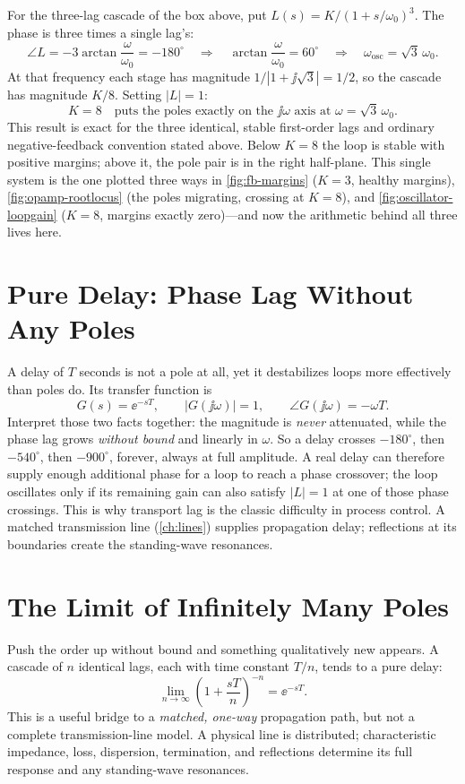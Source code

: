 For the three-lag cascade of the box above, put \(L(s)=K/(1+s/\omega_0)^3\). The phase
is three times a single lag's:
\[
\angle L=-3\arctan\!\frac{\omega}{\omega_0}=-180^\circ
\quad\Longrightarrow\quad
\arctan\frac{\omega}{\omega_0}=60^\circ
\quad\Longrightarrow\quad
\omega_{\mathrm{osc}}=\sqrt3\,\omega_0 .
\]
At that frequency each stage has magnitude
\(1/|1+\jj\sqrt3|=1/2\), so the cascade has magnitude \(K/8\). Setting \(|L|=1\):
\[
\boxed{\;K=8\quad\text{puts the poles exactly on the }\jj\omega\text{ axis at }
\omega=\sqrt3\,\omega_0 . \;}
\]
This result is exact for the three identical, stable first-order lags and ordinary
negative-feedback convention stated above.
Below \(K=8\) the loop is stable with positive margins; above it, the pole pair is in
the right half-plane. This single system is the one plotted three ways in
\cref{fig:fb-margins} (\(K=3\), healthy margins),
\cref{fig:opamp-rootlocus} (the poles migrating, crossing at \(K=8\)), and
\cref{fig:oscillator-loopgain} (\(K=8\), margins exactly zero)---and now the arithmetic
behind all three lives here.

\section{Pure Delay: Phase Lag Without Any Poles}
\label{sec:puredelay}
A delay of \(T\) seconds is not a pole at all, yet it destabilizes loops more
effectively than poles do. Its transfer function is
\[
G(s)=\ee^{-sT},
\qquad
|G(\jj\omega)|=1,
\qquad
\angle G(\jj\omega)=-\omega T .
\]
\cite[pp.~139--140]{leigh2012control}
Interpret those two facts together: the magnitude is \emph{never} attenuated, while the
phase lag grows \emph{without bound} and linearly in \(\omega\). So a delay crosses
\(-180^\circ\), then \(-540^\circ\), then \(-900^\circ\), forever, always at full
amplitude. A real delay can therefore supply enough additional phase for a loop to
reach a phase crossover;
the loop oscillates only if its remaining gain can also satisfy \(|L|=1\) at one of
those phase crossings. This is why transport lag is the classic difficulty in process
control. A matched transmission line (\cref{ch:lines}) supplies propagation delay;
reflections at its boundaries create the standing-wave resonances.

\section{The Limit of Infinitely Many Poles}
\label{sec:infinitepoles}
Push the order up without bound and something qualitatively new appears. A cascade
of \(n\) identical lags, each with time constant \(T/n\), tends to a pure delay:
\[
\lim_{n\to\infty}\left(1+\frac{sT}{n}\right)^{-n}=\ee^{-sT}.
\]
This is a useful bridge to a \emph{matched, one-way} propagation path, but not a
complete transmission-line model. A physical line is distributed; characteristic
impedance, loss, dispersion, termination, and reflections determine its full
response and any standing-wave resonances.

